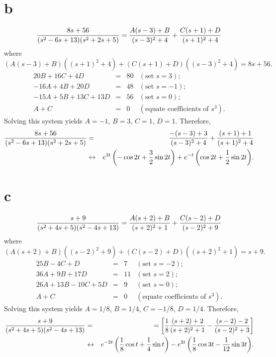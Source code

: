 \documentclass[dvips]{book}
\numberwithin{example}{section}
\numberwithin{equation}{section}
\numberwithin{theorem}{section}
\numberwithin{table}{section}
\numberwithin{figure}{section}
\begin{document}
\part{b}
$${8s+56\over(s^2-6s+13)(s^2+2s+5)}
={A(s-3)+B\over(s-3)^2+4}+{C(s+1)+D\over(s+1)^2+4}
$$
where
$$
(A(s-3)+B)((s+1)^2+4)+(C(s+1)+D)((s-3)^2+4)=8s+56.
$$
$$
\begin{array}{rcrl}
20B+16C+4D&=&80&(\mbox{set }s=3);\\
-16A+4B+20D&=&48& (\mbox{set }s=-1);\\
-15A+5B+13C+13D&=&56&(\mbox{set }s=0);\\
A+C&=&0&(\mbox{equate coefficients of }s^3).
\end{array}
$$
Solving this system yields $A=-1$, $B=3$,
$C=1$, $D=1$. Therefore,
\begin{eqnarray*}
{8s+56\over(s^2-6s+13)(s^2+2s+5)}
&=&{-(s-3)+3\over(s-3)^2+4}+{(s+1)+1\over(s+1)^2+4}
\\&\leftrightarrow&
{e^{3t}\left(-\cos 2t+{3\over2}\sin
2t\right)+e^{-t}\left(\cos 2t+{1\over2}\sin 2t\right)}.
\end{eqnarray*}

\part{c}
$${s+9\over(s^2+4s+5)(s^2-4s+13)}
={A(s+2)+B\over(s+2)^2+1}+{C(s-2)+D\over(s-2)^2+9}
$$
where
$$
(A(s+2)+B)((s-2)^2+9)+(C(s-2)+D)((s+2)^2+1)=s+9.
$$
$$
\begin{array}{rcrl}
25B-4C+D&=&7&(\mbox{set }s=-2);\\
36A+9B+17D&=&11& (\mbox{set }s=2);\\
26A+13B-10C+5D&=&9&(\mbox{set }s=0);\\
A+C&=&0&(\mbox{equate coefficients of }s^3).
\end{array}
$$
Solving this system yields $A=1/8$, $B=1/4$,
$C=-1/8$, $D=1/4$. Therefore,
\begin{eqnarray*}
{s+9\over(s^2+4s+5)(s^2-4s+13)}
&=&
=\left[{1\over8}{(s+2)+2\over(s+2)^2+1}-{(s-2)-2\over(s-2)^2+3}\right]
\\&\leftrightarrow&
{e^{-2t}\left({1\over8}\cos t+{1\over
4}\sin t\right)-e^{2t}\left({1\over8}\cos 3t-{1\over 12}\sin
3t\right)}.
\end{eqnarray*}
\end{document}
